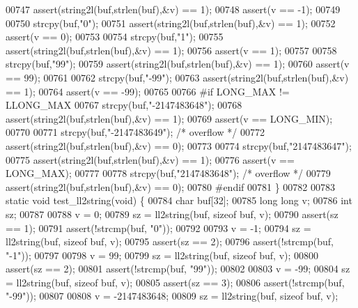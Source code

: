 \begin{DoxyCode}
{{{00747     assert(string2l(buf,strlen(buf),&v) == 1);
00748     assert(v == -1);
00749 
00750     strcpy(buf,\textcolor{stringliteral}{"0"});
00751     assert(string2l(buf,strlen(buf),&v) == 1);
00752     assert(v == 0);
00753 
00754     strcpy(buf,\textcolor{stringliteral}{"1"});
00755     assert(string2l(buf,strlen(buf),&v) == 1);
00756     assert(v == 1);
00757 
00758     strcpy(buf,\textcolor{stringliteral}{"99"});
00759     assert(string2l(buf,strlen(buf),&v) == 1);
00760     assert(v == 99);
00761 
00762     strcpy(buf,\textcolor{stringliteral}{"-99"});
00763     assert(string2l(buf,strlen(buf),&v) == 1);
00764     assert(v == -99);
00765 
00766 \textcolor{preprocessor}{#}\textcolor{preprocessor}{if} \textcolor{preprocessor}{LONG\_MAX} \textcolor{preprocessor}{!=} \textcolor{preprocessor}{LLONG\_MAX}
00767     strcpy(buf,\textcolor{stringliteral}{"-2147483648"});
00768     assert(string2l(buf,strlen(buf),&v) == 1);
00769     assert(v == LONG\_MIN);
00770 
00771     strcpy(buf,\textcolor{stringliteral}{"-2147483649"}); \textcolor{comment}{/* overflow */}
00772     assert(string2l(buf,strlen(buf),&v) == 0);
00773 
00774     strcpy(buf,\textcolor{stringliteral}{"2147483647"});
00775     assert(string2l(buf,strlen(buf),&v) == 1);
00776     assert(v == LONG\_MAX);
00777 
00778     strcpy(buf,\textcolor{stringliteral}{"2147483648"}); \textcolor{comment}{/* overflow */}
00779     assert(string2l(buf,strlen(buf),&v) == 0);
00780 \textcolor{preprocessor}{#}\textcolor{preprocessor}{endif}
00781 \}
00782 
00783 \textcolor{keyword}{static} \textcolor{keywordtype}{void} test\_ll2string(\textcolor{keywordtype}{void}) \{
00784     \textcolor{keywordtype}{char} buf[32];
00785     \textcolor{keywordtype}{long} \textcolor{keywordtype}{long} v;
00786     \textcolor{keywordtype}{int} sz;
00787 
00788     v = 0;
00789     sz = ll2string(buf, \textcolor{keyword}{sizeof} buf, v);
00790     assert(sz == 1);
00791     assert(!strcmp(buf, \textcolor{stringliteral}{"0"}));
00792 
00793     v = -1;
00794     sz = ll2string(buf, \textcolor{keyword}{sizeof} buf, v);
00795     assert(sz == 2);
00796     assert(!strcmp(buf, \textcolor{stringliteral}{"-1"}));
00797 
00798     v = 99;
00799     sz = ll2string(buf, \textcolor{keyword}{sizeof} buf, v);
00800     assert(sz == 2);
00801     assert(!strcmp(buf, \textcolor{stringliteral}{"99"}));
00802 
00803     v = -99;
00804     sz = ll2string(buf, \textcolor{keyword}{sizeof} buf, v);
00805     assert(sz == 3);
00806     assert(!strcmp(buf, \textcolor{stringliteral}{"-99"}));
00807 
00808     v = -2147483648;
00809     sz = ll2string(buf, \textcolor{keyword}{sizeof} buf, v);
}}}
\end{DoxyCode}
